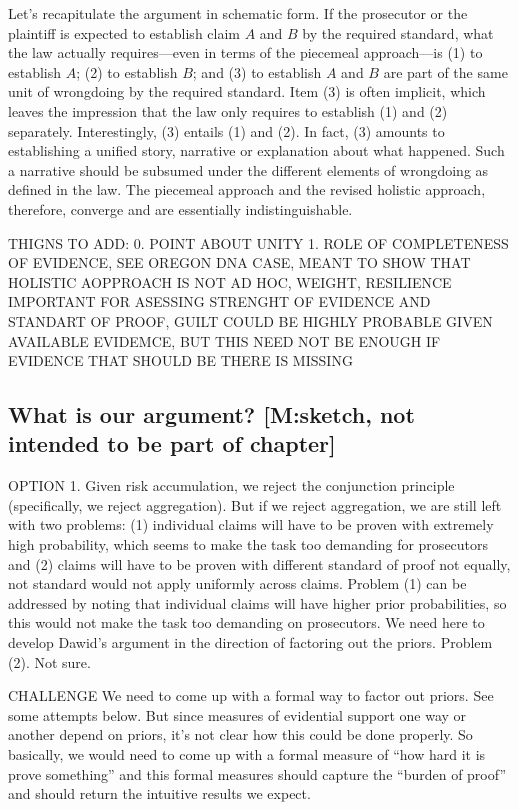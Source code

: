 \documentclass[
  10pt,
  dvipsnames,enabledeprecatedfontcommands]{scrartcl}
\begin{document}
Let's recapitulate the argument in schematic form. If the prosecutor or
the plaintiff is expected to establish claim \(A\) and \(B\) by the
required standard, what the law actually requires---even in terms of the
piecemeal approach---is (1) to establish \(A\); (2) to establish \(B\);
and (3) to establish \(A\) and \(B\) are part of the same unit of
wrongdoing by the required standard. Item (3) is often implicit, which
leaves the impression that the law only requires to establish (1) and
(2) separately. Interestingly, (3) entails (1) and (2). In fact, (3)
amounts to establishing a unified story, narrative or explanation about
what happened. Such a narrative should be subsumed under the different
elements of wrongdoing as defined in the law. The piecemeal approach and
the revised holistic approach, therefore, converge and are essentially
indistinguishable.

THIGNS TO ADD: 0. POINT ABOUT UNITY 1. ROLE OF COMPLETENESS OF EVIDENCE,
SEE OREGON DNA CASE, MEANT TO SHOW THAT HOLISTIC AOPPROACH IS NOT AD
HOC, WEIGHT, RESILIENCE IMPORTANT FOR ASESSING STRENGHT OF EVIDENCE AND
STANDART OF PROOF, GUILT COULD BE HIGHLY PROBABLE GIVEN AVAILABLE
EVIDEMCE, BUT THIS NEED NOT BE ENOUGH IF EVIDENCE THAT SHOULD BE THERE
IS MISSING

\hypertarget{what-is-our-argument-msketch-not-intended-to-be-part-of-chapter}{%
\subsection{What is our argument? {[}M:sketch, not intended to be part
of
chapter{]}}\label{what-is-our-argument-msketch-not-intended-to-be-part-of-chapter}}

OPTION 1. Given risk accumulation, we reject the conjunction principle
(specifically, we reject aggregation). But if we reject aggregation, we
are still left with two problems: (1) individual claims will have to be
proven with extremely high probability, which seems to make the task too
demanding for prosecutors and (2) claims will have to be proven with
different standard of proof not equally, not standard would not apply
uniformly across claims. Problem (1) can be addressed by noting that
individual claims will have higher prior probabilities, so this would
not make the task too demanding on prosecutors. We need here to develop
Dawid's argument in the direction of factoring out the priors. Problem
(2). Not sure.

CHALLENGE We need to come up with a formal way to factor out priors. See
some attempts below. But since measures of evidential support one way or
another depend on priors, it's not clear how this could be done
properly. So basically, we would need to come up with a formal measure
of ``how hard it is prove something'' and this formal measures should
capture the ``burden of proof'' and should return the intuitive results
we expect.
\end{document}

